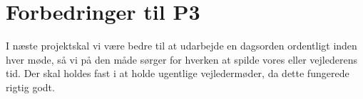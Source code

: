 \section{Forbedringer til P3}

I næste projektskal vi være bedre til at udarbejde en dagsorden ordentligt inden hver møde, så vi på den måde sørger for hverken at spilde vores eller vejlederens tid. Der skal holdes fast i at holde ugentlige vejledermøder, da dette fungerede rigtig godt. 
